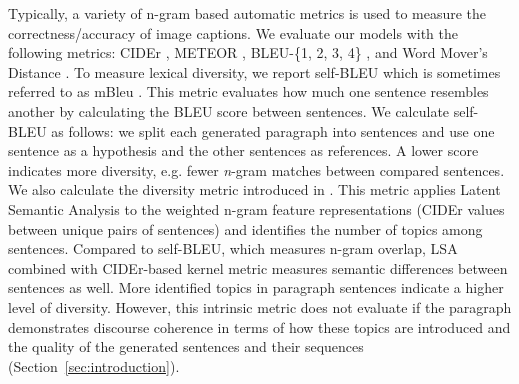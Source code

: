 \documentclass[11pt,a4paper]{article}
\begin{document}
Typically, a variety of n-gram based automatic metrics is used to measure the correctness/accuracy of image captions.
We evaluate our models %
with the following metrics: CIDEr \cite{vedantam2014cider}, METEOR \cite{meteor14}, BLEU-\{1, 2, 3, 4\} \cite{bleu}, and Word Mover's Distance \cite{Kusner2015FromWE,kilickaya2017}.
To measure lexical diversity, we report self-BLEU \cite{Zhu2018selfbleu} which is sometimes referred to as mBleu \cite{Shetty2017}. %
This metric evaluates how much one sentence resembles another by calculating the BLEU score between sentences.
We calculate self-BLEU as follows: we split each generated paragraph into sentences and use one sentence as a hypothesis and the other sentences as references.
A lower score indicates more diversity, e.g. fewer \textit{n}-gram matches between compared sentences.
We also calculate the diversity metric introduced in \cite{wang2019describing}.
This metric applies Latent Semantic Analysis \cite{deerwester90indexing} to the weighted n-gram feature representations (CIDEr values between unique pairs of sentences) and identifies the number of topics among sentences.
Compared to self-BLEU, which measures n-gram overlap, LSA combined with CIDEr-based kernel metric measures semantic differences between sentences as well.
More identified topics in paragraph sentences indicate a higher level of diversity.
However, this intrinsic metric does not evaluate if the paragraph demonstrates discourse coherence in terms of how these topics are introduced and the quality of the generated sentences and their sequences (Section~\ref{sec:introduction}). %

\end{document}
